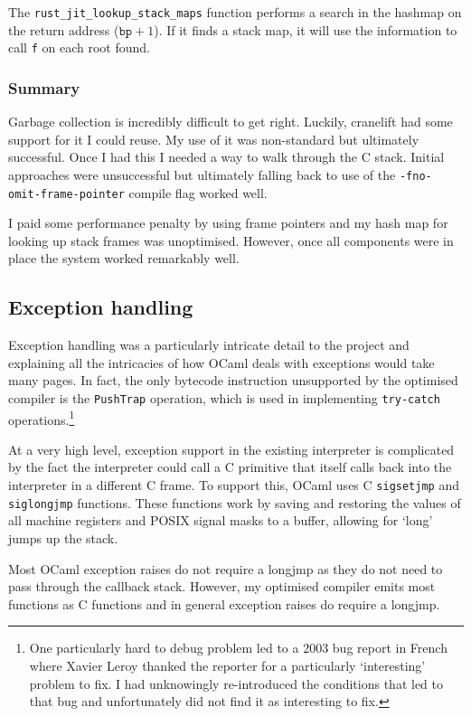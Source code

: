 The \texttt{rust\_jit\_lookup\_stack\_maps} function performs a search in the hashmap on the return
address
($\texttt{bp} + 1$). If it finds a stack map, it will use the information to call \texttt{f} on
each root found.

\subsubsection{Summary}

Garbage collection is incredibly difficult to get right. Luckily, cranelift had some support for it
I could reuse. My use of it was non-standard but ultimately successful. Once I had this I needed a
way to walk through the C stack. Initial approaches were unsuccessful but ultimately falling back
to use of the \texttt{-fno-omit-frame-pointer} compile flag worked well.

I paid some performance penalty by using frame pointers and my hash map for looking up stack frames
was unoptimised. However, once all components were in place the system worked remarkably well.

\subsection{Exception handling} \label{exception-handling}

Exception handling was a particularly intricate detail to the project and explaining all the
intricacies of how OCaml deals with exceptions would take many pages. In fact, the only bytecode
instruction unsupported by the optimised compiler is the \texttt{PushTrap} operation, which is used
in implementing \texttt{try-catch} operations.\footnote{One particularly hard to debug problem led
      to a 2003 bug
      report in French where Xavier Leroy thanked the reporter for a particularly `interesting'
      problem
      to fix. I had unknowingly re-introduced the conditions that led to that bug and unfortunately
      did not find it as interesting to fix.}

At a very high level, exception support in the existing interpreter is complicated by the fact the
interpreter could call a C primitive that itself calls back into the interpreter in a different C
frame. To support this, OCaml uses C \texttt{sigsetjmp} and \texttt{siglongjmp} functions. These
functions work by saving and restoring the values of all machine registers and POSIX signal masks
to a buffer, allowing for `long' jumps up the stack.

Most OCaml exception raises do not require a longjmp as they do not need to pass through
the callback stack. However, my optimised compiler emits most functions as C functions and in
general exception raises do require a longjmp.

